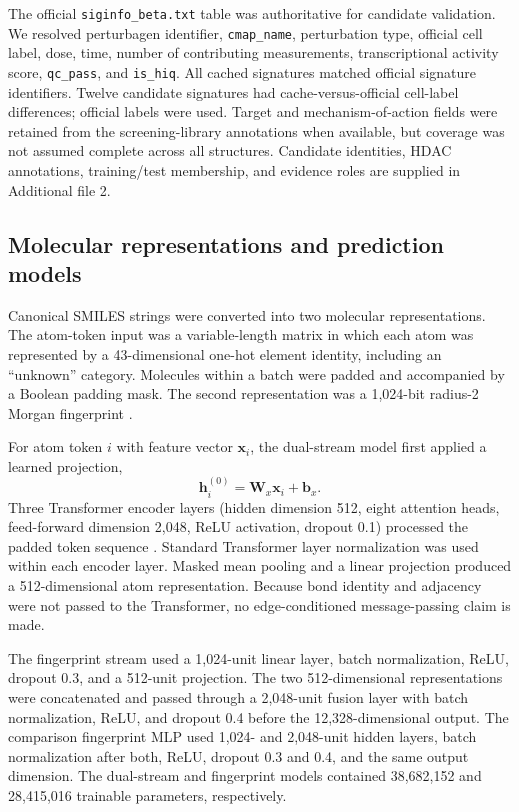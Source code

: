 

The official \texttt{siginfo\_beta.txt} table was authoritative for candidate validation. We resolved perturbagen identifier, \texttt{cmap\_name}, perturbation type, official cell label, dose, time, number of contributing measurements, transcriptional activity score, \texttt{qc\_pass}, and \texttt{is\_hiq}. All cached signatures matched official signature identifiers. Twelve candidate signatures had cache-versus-official cell-label differences; official labels were used. Target and mechanism-of-action fields were retained from the screening-library annotations when available, but coverage was not assumed complete across all structures. Candidate identities, HDAC annotations, training/test membership, and evidence roles are supplied in Additional file 2.

\subsection{Molecular representations and prediction models}

\begin{minorrevision}
Canonical SMILES strings were converted into two molecular representations. The atom-token input was a variable-length matrix in which each atom was represented by a 43-dimensional one-hot element identity, including an ``unknown'' category. Molecules within a batch were padded and accompanied by a Boolean padding mask. The second representation was a 1,024-bit radius-2 Morgan fingerprint \cite{landrum2013,rogers2010}.

For atom token $i$ with feature vector $\bm{x}_i$, the dual-stream model first applied a learned projection,
\begin{equation}
\bm{h}^{(0)}_i=\bm{W}_{x}\bm{x}_i+\bm{b}_{x}.
\end{equation}
Three Transformer encoder layers (hidden dimension 512, eight attention heads, feed-forward dimension 2,048, ReLU activation, dropout 0.1) processed the padded token sequence \cite{vaswani2017}. Standard Transformer layer normalization was used within each encoder layer. Masked mean pooling and a linear projection produced a 512-dimensional atom representation. Because bond identity and adjacency were not passed to the Transformer, no edge-conditioned message-passing claim is made.

The fingerprint stream used a 1,024-unit linear layer, batch normalization, ReLU, dropout 0.3, and a 512-unit projection. The two 512-dimensional representations were concatenated and passed through a 2,048-unit fusion layer with batch normalization, ReLU, and dropout 0.4 before the 12,328-dimensional output. The comparison fingerprint MLP used 1,024- and 2,048-unit hidden layers, batch normalization after both, ReLU, dropout 0.3 and 0.4, and the same output dimension. The dual-stream and fingerprint models contained 38,682,152 and 28,415,016 trainable parameters, respectively.\par
\end{minorrevision}


